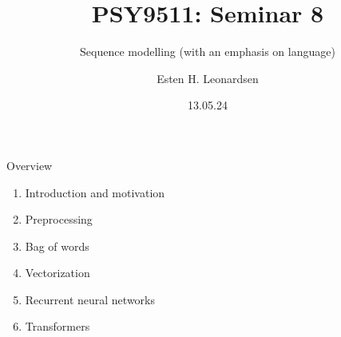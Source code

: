 \documentclass[10pt]{beamer}
\title{PSY9511: Seminar 8}
\subtitle{Sequence modelling (with an emphasis on language)}
\author{Esten H. Leonardsen}
\date{13.05.24}
\begin{document}
	\begin{frame}
	 	\titlepage
	\end{frame}

    \begin{frame}{Overview}
        \begin{enumerate}
            \item Introduction and motivation
            \item Preprocessing
            \item Bag of words
            \item Vectorization
            \item Recurrent neural networks
            \item Transformers
        \end{enumerate}
    \end{frame}

    \newcommand{\drawsmiley}[1]{
        \begin{tikzpicture}[scale=0.35]
            \foreach \x in {0,...,9} {
                \foreach \y in {0,...,9} {
                    \ifnum#1=1
                        \fill[white] (\x,\y) rectangle (\x+1,\y+1);
                    \fi
                    \ifnum#1>1
                        \fill[black!2] (\x,\y) rectangle (\x+1,\y+1);
                    \fi
                }
            }

            \ifnum#1=3
                \foreach \x in {2,...,5} {
                    \foreach \y in {4,...,8} {
                        \fill[white] (\x,\y) rectangle (\x+1,\y+1);
                    }
                }
            \fi

            \fill[black] (3,6) rectangle (4,7);

            \ifnum#1=1
                \fill[black] (6,6) rectangle (7,7);
                \fill[black] (3,4) rectangle (4,5);
                \fill[black] (6,4) rectangle (7,5);
                \fill[black] (4,3) rectangle (6,4);

                \fill[black] (1,2) rectangle (2,8);
                \fill[black] (8,2) rectangle (9,8);
                \fill[black] (2,1) rectangle (8,2);
                \fill[black] (2,8) rectangle (8,9);

                \draw[gray, very thin] (0,0) grid (10,10);
            \fi

            \ifnum#1=3
                \fill[black] (3,4) rectangle (4,5);

                \fill[black] (1,4) rectangle (2,8);
                \fill[black] (2,8) rectangle (6,9);

                \draw[gray, very thin] (1,4) grid (6,9);
            \fi

        \end{tikzpicture}
    }
\end{document}

